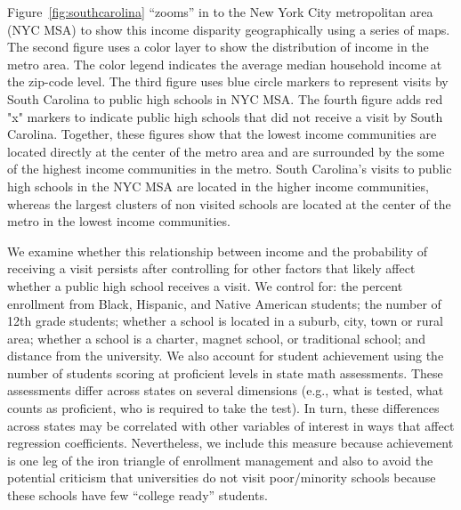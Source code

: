\documentclass[twoside]{article}
\begin{document}
Figure~\ref{fig:southcarolina} ``zooms'' in to the New York City metropolitan area (NYC MSA) to show this income disparity geographically using a series of maps. The second figure uses a color layer to show the distribution of income in the metro area. The color legend indicates the average median household income at the zip-code level. The third figure uses blue circle markers to represent visits by South Carolina to public high schools in NYC MSA. The fourth figure adds red "x" markers to indicate public high schools that did not receive a visit by South Carolina. Together, these figures show that the lowest income communities are located directly at the center of the metro area and are surrounded by the some of the highest income communities in the metro. South Carolina's visits to public high schools in the NYC MSA are located in the higher income communities, whereas the largest clusters of non visited schools are located at the center of the metro in the lowest income communities.

We examine whether this relationship between income and the probability of receiving a visit persists after controlling for other factors that likely affect whether a public high school receives a visit. We control for: the percent enrollment from Black, Hispanic, and Native American students; the number of 12th grade students; whether a school is located in a suburb, city, town or rural area; whether a school is a charter, magnet school, or traditional school; and distance from the university. We also account for student achievement using the number of students scoring at proficient levels in state math assessments. These assessments differ across states on several dimensions (e.g., what is tested, what counts as proficient, who is required to take the test). In turn, these differences across states may be correlated with other variables of interest in ways that affect regression coefficients. Nevertheless, we include this measure because achievement is one leg of the iron triangle of enrollment management and also to avoid the potential criticism that universities do not visit poor/minority schools because these schools have few ``college ready'' students.
\end{document}
